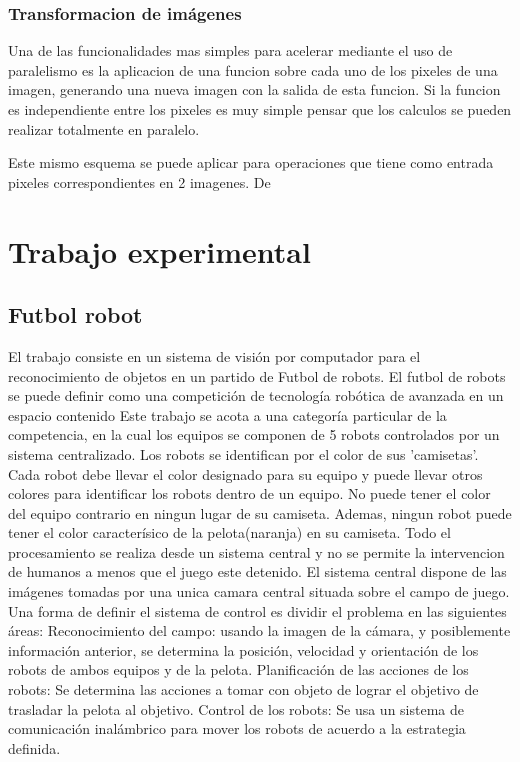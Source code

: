 \documentclass[a4paper,10pt]{report}
\begin{document}
\subsection{Transformacion de imágenes}


Una de las funcionalidades mas simples para acelerar mediante el uso de paralelismo es la aplicacion de una funcion sobre cada uno de los pixeles de una imagen, generando una nueva imagen con la salida de esta funcion.
Si la funcion es independiente entre los pixeles es muy simple pensar que los calculos se pueden realizar totalmente en paralelo.



Este mismo esquema se puede aplicar para operaciones que tiene como entrada pixeles correspondientes en 2 imagenes. De






\chapter{Trabajo experimental}
\section{Futbol robot}
El trabajo consiste en un sistema de visión por computador para el reconocimiento de objetos en un partido de Futbol de robots.
El futbol de robots se puede definir como una competición de tecnología robótica de avanzada en un espacio contenido
Este trabajo se acota a una categoría particular de la competencia, en la cual los equipos se componen de 5 robots controlados por un sistema centralizado. 
Los robots se identifican por el color de sus 'camisetas'. Cada robot debe llevar el color designado para su equipo y puede llevar otros colores para identificar los robots dentro de un equipo.
No puede tener el color del equipo contrario en ningun lugar de su camiseta.
Ademas, ningun robot puede tener el color caracterísico de la pelota(naranja) en su camiseta.
Todo el procesamiento se realiza desde un sistema central y no se permite la intervencion de humanos a menos que el juego este detenido.
El sistema central dispone de las imágenes tomadas por una unica camara central situada sobre el campo de juego.
Una forma de definir el sistema de control es dividir el problema en las siguientes áreas:
Reconocimiento del campo: usando la imagen de la cámara, y posiblemente información anterior, se determina la posición, velocidad y orientación de los robots de ambos equipos y de la pelota.
Planificación de las acciones de los robots: Se determina las acciones a tomar con objeto de lograr el objetivo de trasladar la pelota al objetivo.
Control de los robots: Se usa un sistema de comunicación inalámbrico para mover los robots de acuerdo a la estrategia definida.
\end{document}
